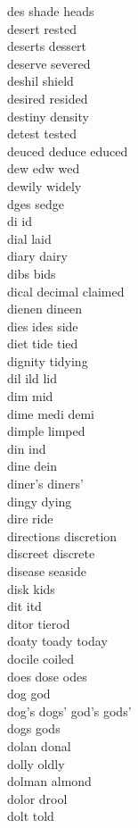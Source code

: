 des shade heads  \\
desert rested\\
deserts dessert\\
deserve severed\\
deshil shield\\
desired resided\\
destiny density\\
detest tested\\
deuced deduce educed\\
dew edw wed\\
dewily widely\\
dges sedge \\
di id\\
dial laid\\
diary dairy\\
dibs bids\\
dical decimal claimed  \\
dienen dineen\\
dies ides side\\
diet tide tied\\
dignity tidying\\
dil ild lid\\
dim mid\\
dime medi demi\\
dimple limped\\
din ind\\
dine dein\\
diner's diners'\\
dingy dying\\
dire ride\\
directions discretion\\
discreet discrete\\
disease seaside\\
disk kids\\
dit itd\\
ditor tierod \\
doaty toady today\\
docile coiled\\
does dose odes\\
dog god\\
dog's dogs' god's gods'\\
dogs gods\\
dolan donal\\
dolly oldly\\
dolman almond\\
dolor drool\\
dolt told\\

